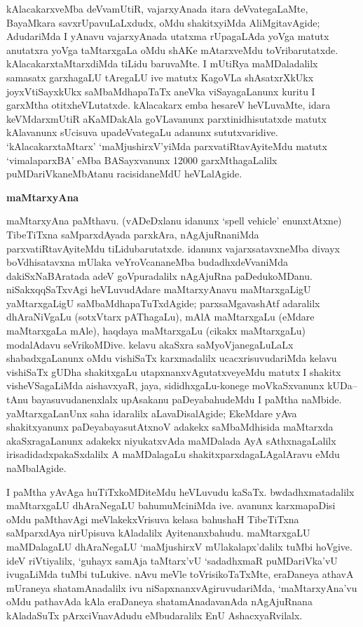 kAlacakarxveMba deVvamUtiR, vajarxyAnada itara deVvategaLaMte, BayaMkara savxrUpavuLaLxdudx, oMdu shakitxyiMda AliMgitavAgide; AdudariMda I yAnavu vajarxyAnada utatxma rUpagaLAda yoVga matutx anutatxra yoVga taMtarxgaLa oMdu shAKe mAtarxveMdu toVribarutatxde. kAlacakarxtaMtarxdiMda tiLidu baruvaMte. I mUtiRya maMDaladalilx samasatx garxhagaLU tAregaLU ive matutx KagoVLa shAsatxrXkUkx joyxVtiSayxkUkx saMbaMdhapaTaTx aneVka viSayagaLanunx kuritu I garxMtha otitxheVLutatxde. kAlacakarx emba hesareV heVLuvaMte, idara keVMdarxmUtiR aKaMDakAla goVLavanunx parxtinidhisutatxde matutx kAlavanunx sUcisuva upadeVvategaLu adanunx sututxvaridive. `kAlacakarxtaMtarx' `maMjushirxV'yiMda parxvatiRtavAyiteMdu matutx `vimalaparxBA' eMba BASayxvanunx {\rm 12000} garxMthagaLalilx puMDariVkaneMbAtanu racisidaneMdU heVLalAgide.

\bigskip
\begin{center}
{\Large\bf maMtarxyAna}
\end{center}

maMtarxyAna paMthavu. (vADeDxlanu idanunx {\rm`spell vehicle'} enunxtAtxne) Tibe\-TiTxna saMparxdAyada parxkAra, nAgAjuRnaniMda parxvatiRtavAyiteMdu tiLidubarutatxde. idanunx vajarxsatavxneMba divayx boVdhisatavxna mUlaka veYroVcananeMba budadhxdeVvaniMda dakiSxNaBAratada adeV goVpuradalilx nAgAjuRna paDedukoMDanu. niSakxqqSaTxvAgi heVLuvudAdare maMtarxyAnavu maMtarxgaLigU yaMtarxgaLigU saMbaMdhapaTuTxdAgide; parxsaMgavashAtf adaralilx dhAraNiVgaLu (sotxVtarx pAThagaLu), mAlA maMtarxgaLu (eMdare maMtarxgaLa mAle), haqdaya maMtarxgaLu (cikakx maMtarxgaLu) modalAdavu seVrikoMDive. kelavu akaSxra saMyoVjanegaLuLaLx shabadxgaLanunx oMdu vishiSaTx karxmadalilx ucacxrisuvudariMda kelavu vishiSaTx gUDha shakitxgaLu utapxnanxvAgutatxveyeMdu matutx I shakitx visheVSagaLiMda aishavxyaR, jaya, sididhxgaLu-konege moVkaSxvanunx kUDa--tAnu bayasuvudanenxlalx upAsakanu paDeyabahudeMdu I paMtha naMbide. yaMtarxgaLanUnx saha idaralilx aLavaDisalAgide; EkeMdare yAva shakitxyanunx paDeyabayasutAtxnoV adakekx saMbaMdhisida maMtarxda akaSxragaLanunx adakekx niyukatxvAda maMDalada AyA sAthxnagaLalilx irisadidadxpakaSxdalilx A maMDalagaLu shakitxparxdagaLAgalAravu eMdu naMbalAgide.

I paMtha yAvAga huTiTxkoMDiteMdu heVLuvudu kaSaTx. bwdadhxmatadalilx maMtarxgaLU dhAraNegaLU bahumuMciniMda ive. avanunx karxmapaDisi oMdu paMthavAgi meVlakekxVrisuva kelasa bahushaH TibeTiTxna saMparxdAya nirUpisuva kAladalilx Ayitenanxbahudu. maMtarxgaLU maMDalagaLU dhAraNegaLU `maMjushirxV mUlakalapx'dalilx tuMbi hoVgive. ideV riVtiyalilx, `guhayx samAja taMtarx'vU `sadadhxmaR puMDariVka'vU ivugaLiMda tuMbi tuLukive. nAvu meVle toVrisikoTaTxMte, eraDaneya athavA mUraneya shatamAnadalilx ivu niSapxnanxvAgiruvudariMda, `maMtarxyAna'vu oMdu pathavAda kAla eraDaneya shatamAnadavanAda nAgAjuRnana kAladaSuTx pArxciVnavAdudu eMbudaralilx EnU AshacxyaRvilalx.

\theendnotes

